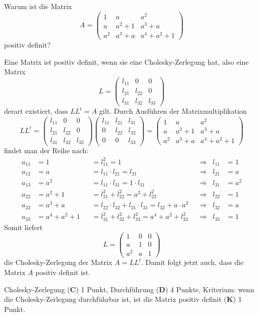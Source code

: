 Warum ist die Matrix
\[
A
=
\begin{pmatrix}
1&a&a^2\\
a&a^2+1&a^3+a\\
a^2&a^3+a&a^4+a^2+1
\end{pmatrix}
\]
positiv definit?

\begin{loesung}
Eine Matrix ist positiv definit, wenn sie eine Cholesky-Zerlegung hat,
also eine Matrix
\[
L
=
\begin{pmatrix}
l_{11}&0&0\\
l_{21}&l_{22}&0\\
l_{31}&l_{32}&l_{33}
\end{pmatrix}
\]
derart existiert, dass $LL^t=A$ gilt.
Durch Ausführen der Matrixmultiplikation
\[
LL^t
=
\begin{pmatrix}
l_{11}&0&0\\
l_{21}&l_{22}&0\\
l_{31}&l_{32}&l_{33}
\end{pmatrix}
\begin{pmatrix}
l_{11}&l_{21}&l_{31}\\
0&l_{22}&l_{32}\\
0&0&l_{33}
\end{pmatrix}
=
\begin{pmatrix}
1&a&a^2\\
a&a^2+1&a^3+a\\
a^2&a^3+a&a^4+a^2+1
\end{pmatrix}
\]
findet man der Reihe nach:
\begin{align*}
a_{11}&=1&
&=
l_{11}^2 =1
&&\Rightarrow&
l_{11}&=1\\
a_{12}&=a&
&=
l_{11}\cdot l_{21}
=
l_{21}
&&\Rightarrow&
l_{21}&=a\\
a_{13}&=a^2&
&=
l_{11}\cdot l_{31}=1\cdot l_{31}
&&\Rightarrow&
l_{31}&=a^2\\
a_{22}&=a^2+1&
&=
l_{21}^2 + l_{22}^2=a^2 + l_{22}^2
&&\Rightarrow&
l_{22}&=1\\
a_{23}&=a^3+a&
&=
l_{22}\cdot l_{32} + l_{21}\cdot l_{31} 
=
l_{32} + a\cdot a^2
&&\Rightarrow&
l_{32}&=a\\
a_{33}&=a^4+a^2+1&
&=
l_{31}^2 + l_{32}^2 + l_{33}^2=a^4+a^2+l_{33}^2
&&\Rightarrow&
l_{33}&=1
\end{align*}
Somit liefert
\[
L=\begin{pmatrix}
1&0&0\\
a&1&0\\
a^2&a&1
\end{pmatrix}
\]
die Cholesky-Zerlegung der Matrix $A=LL^t$.
Damit folgt jetzt auch, dass die Matrix $A$ positiv definit ist.
\end{loesung}

\begin{bewertung}
Cholesky-Zerlegung ({\bf C}) 1 Punkt,
Durchführung ({\bf D}) 4 Punkte,
Kriterium: wenn die Cholesky-Zerlegung durchführbar ist, ist die
Matrix positiv definit ({\bf K}) 1 Punkt.
\end{bewertung}
